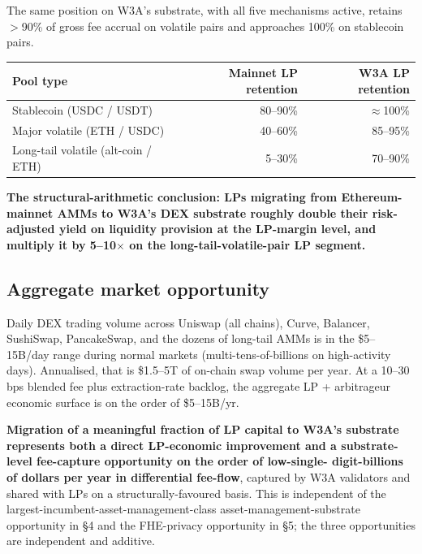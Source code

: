 The same position on W3A's substrate, with all five mechanisms active,
retains $>$90\% of gross fee accrual on volatile pairs and approaches
100\% on stablecoin pairs.

\begin{center}
\small
\begin{tabular}{lrr}
\toprule
Pool type & Mainnet LP retention & W3A LP retention \\
\midrule
Stablecoin (USDC / USDT) & 80--90\% & $\approx$100\% \\
Major volatile (ETH / USDC) & 40--60\% & 85--95\% \\
Long-tail volatile (alt-coin / ETH) & 5--30\% & 70--90\% \\
\bottomrule
\end{tabular}
\end{center}

\textbf{The structural-arithmetic conclusion: LPs migrating from
Ethereum-mainnet AMMs to W3A's DEX substrate roughly double their
risk-adjusted yield on liquidity provision at the LP-margin level, and
multiply it by 5--10$\times$ on the long-tail-volatile-pair LP segment.}

\subsection{Aggregate market opportunity}

Daily DEX trading volume across Uniswap (all chains), Curve, Balancer,
SushiSwap, PancakeSwap, and the dozens of long-tail AMMs is in the
\$5--15B/day range during normal markets (multi-tens-of-billions on
high-activity days). Annualised, that is \$1.5--5T of on-chain swap
volume per year. At a 10--30 bps blended fee plus extraction-rate
backlog, the aggregate LP + arbitrageur economic surface is on the
order of \$5--15B/yr.

\textbf{Migration of a meaningful fraction of LP capital to W3A's
substrate represents both a direct LP-economic improvement and a
substrate-level fee-capture opportunity on the order of low-single-
digit-billions of dollars per year in differential fee-flow}, captured
by W3A validators and shared with LPs on a structurally-favoured
basis. This is independent of the largest-incumbent-asset-management-class
asset-management-substrate opportunity in \S 4 and the FHE-privacy
opportunity in \S 5; the three opportunities are independent and
additive.
